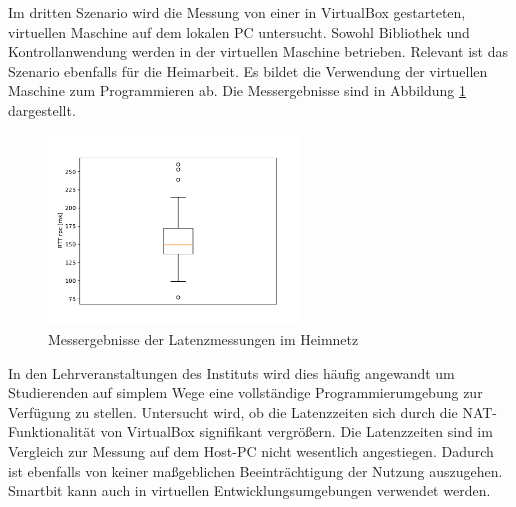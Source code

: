 \documentclass[11pt,a4paper]{report}
\begin{document}
Im dritten Szenario wird die Messung von einer in VirtualBox gestarteten, virtuellen Maschine auf dem lokalen PC untersucht.
Sowohl Bibliothek und Kontrollanwendung werden in der virtuellen Maschine betrieben.
Relevant ist das Szenario ebenfalls für die Heimarbeit.
Es bildet die Verwendung der virtuellen Maschine zum Programmieren ab.
Die Messergebnisse sind in Abbildung \ref{fig:measure_vm} dargestellt.
\begin{figure}[htbp]
  \centering
  \includegraphics[width=0.6\textwidth]{images/timing_vm}
  \caption{Messergebnisse der Latenzmessungen im Heimnetz}
  \label{fig:measure_vm}
\end{figure}
In den Lehrveranstaltungen des Instituts wird dies häufig angewandt um Studierenden auf simplem Wege eine vollständige Programmierumgebung zur Verfügung zu stellen. 
Untersucht wird, ob die Latenzzeiten sich durch die NAT-Funktionalität von VirtualBox signifikant vergrößern.
Die Latenzzeiten sind im Vergleich zur Messung auf dem Host-PC nicht wesentlich angestiegen.
Dadurch ist ebenfalls von keiner maßgeblichen Beeinträchtigung der Nutzung auszugehen.
Smartbit kann auch in virtuellen Entwicklungsumgebungen verwendet werden.
\end{document}
